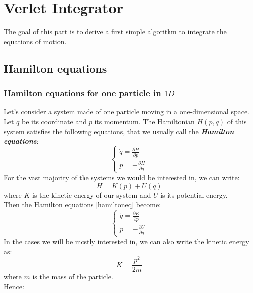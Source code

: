 \section{Verlet Integrator}
The goal of this part is to derive a first simple algorithm to integrate the equations of motion.

\subsection{Hamilton equations}
    \subsubsection{Hamilton equations for one particle in $1D$}
        Let's consider a system made of one particle moving in a one-dimensional space. Let $q$ be its coordinate and $p$ its momentum. The Hamiltonian $H(p,q)$ of this system satisfies the following equations, that we usually call the \textit{\textbf{Hamilton equations}}:
        \begin{equation}
        \begin{cases}
            \dot{q}=\frac{\partial H}{\partial p}\\
            \dot{p}=-\frac{\partial H}{\partial q}
        \end{cases} \label{hamiltoneq}
        \end{equation}
        For the vast majority of the systems we would be interested in, we can write:
        \begin{equation}
            H=K(p)+U(q)
        \end{equation}
        where $K$ is the kinetic energy of our system and $U$ is its potential energy.
        \\ Then the Hamilton equations \eqref{hamiltoneq} become:
        \begin{equation}
        \begin{cases}
            \dot{q}=\frac{\partial K}{\partial p}\\
            \dot{p}=-\frac{\partial U}{\partial q}
        \end{cases}
        \end{equation}
        In the cases we will be mostly interested in, we can also write the kinetic energy as:
        \begin{equation}
            K=\frac{p^2}{2m}
        \end{equation}
        where $m$ is the mass of the particle.
        \\ Hence:

